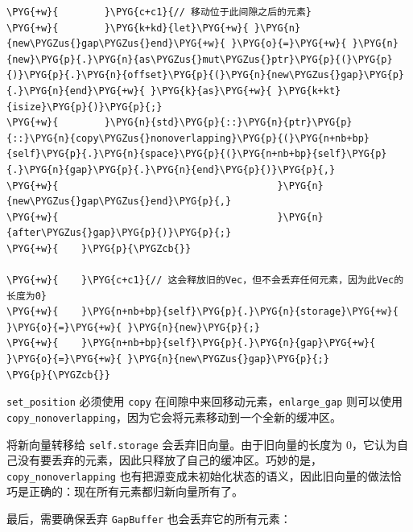 \begin{Verbatim}[commandchars=\\\{\},breaklines=true,breakanywhere=true,fontsize=\codefont,xleftmargin=17bp]
\PYG{+w}{        }\PYG{c+c1}{// 移动位于此间隙之后的元素}
\PYG{+w}{        }\PYG{k+kd}{let}\PYG{+w}{ }\PYG{n}{new\PYGZus{}gap\PYGZus{}end}\PYG{+w}{ }\PYG{o}{=}\PYG{+w}{ }\PYG{n}{new}\PYG{p}{.}\PYG{n}{as\PYGZus{}mut\PYGZus{}ptr}\PYG{p}{(}\PYG{p}{)}\PYG{p}{.}\PYG{n}{offset}\PYG{p}{(}\PYG{n}{new\PYGZus{}gap}\PYG{p}{.}\PYG{n}{end}\PYG{+w}{ }\PYG{k}{as}\PYG{+w}{ }\PYG{k+kt}{isize}\PYG{p}{)}\PYG{p}{;}
\PYG{+w}{        }\PYG{n}{std}\PYG{p}{::}\PYG{n}{ptr}\PYG{p}{::}\PYG{n}{copy\PYGZus{}nonoverlapping}\PYG{p}{(}\PYG{n+nb+bp}{self}\PYG{p}{.}\PYG{n}{space}\PYG{p}{(}\PYG{n+nb+bp}{self}\PYG{p}{.}\PYG{n}{gap}\PYG{p}{.}\PYG{n}{end}\PYG{p}{)}\PYG{p}{,}
\PYG{+w}{                                      }\PYG{n}{new\PYGZus{}gap\PYGZus{}end}\PYG{p}{,}
\PYG{+w}{                                      }\PYG{n}{after\PYGZus{}gap}\PYG{p}{)}\PYG{p}{;}
\PYG{+w}{    }\PYG{p}{\PYGZcb{}}

\PYG{+w}{    }\PYG{c+c1}{// 这会释放旧的Vec，但不会丢弃任何元素，因为此Vec的长度为0}
\PYG{+w}{    }\PYG{n+nb+bp}{self}\PYG{p}{.}\PYG{n}{storage}\PYG{+w}{ }\PYG{o}{=}\PYG{+w}{ }\PYG{n}{new}\PYG{p}{;}
\PYG{+w}{    }\PYG{n+nb+bp}{self}\PYG{p}{.}\PYG{n}{gap}\PYG{+w}{ }\PYG{o}{=}\PYG{+w}{ }\PYG{n}{new\PYGZus{}gap}\PYG{p}{;}
\PYG{p}{\PYGZcb{}}
\end{Verbatim}

\texttt{set\_position} 必须使用 \texttt{copy} 在间隙中来回移动元素，\texttt{enlarge\_gap} 则可以使用 \texttt{copy\_nonoverlapping}，因为它会将元素移动到一个全新的缓冲区。

将新向量转移给 \texttt{self.storage} 会丢弃旧向量。由于旧向量的长度为 0，它认为自己没有要丢弃的元素，因此只释放了自己的缓冲区。巧妙的是，\texttt{copy\_nonoverlapping} 也有把源变成未初始化状态的语义，因此旧向量的做法恰巧是正确的：现在所有元素都归新向量所有了。

最后，需要确保丢弃 \texttt{GapBuffer} 也会丢弃它的所有元素：

